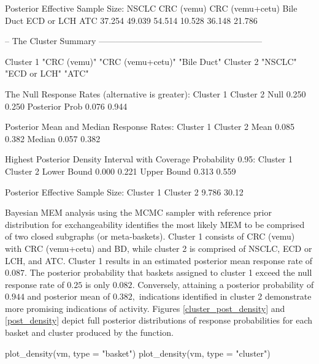 \begin{Schunk}
\begin{Soutput}
    Posterior Effective Sample Size:
      NSCLC CRC (vemu) CRC (vemu+cetu) Bile Duct ECD or LCH    ATC
     37.254     49.039          54.514    10.528     36.148 21.786
    
    -- The Cluster Summary ---------------------------------------------------------
    
    Cluster 1                                           
     "CRC (vemu)" "CRC (vemu+cetu)" "Bile Duct"
    Cluster 2                           
     "NSCLC" "ECD or LCH" "ATC"
    
    The Null Response Rates (alternative is greater):
                   Cluster 1 Cluster 2
    Null               0.250     0.250
    Posterior Prob     0.076     0.944
    
    Posterior Mean and Median Response Rates:
           Cluster 1 Cluster 2
    Mean       0.085     0.382
    Median     0.057     0.382
    
    Highest Posterior Density Interval with Coverage Probability 0.95:
                Cluster 1 Cluster 2
    Lower Bound     0.000     0.221
    Upper Bound     0.313     0.559
    
    Posterior Effective Sample Size:
     Cluster 1 Cluster 2
         9.786     30.12

\end{Soutput}
\end{Schunk}

Bayesian MEM analysis using the MCMC sampler with reference prior distribution for exchangeability identifies the most likely MEM to be comprised of two closed subgraphs (or meta-baskets). Cluster 1 consists of CRC (vemu) with CRC (vemu+cetu) and BD, while cluster 2 is comprised of NSCLC, ECD or LCH, and ATC. Cluster 1 results in an estimated posterior mean response rate of $0.087.$ The posterior probability that baskets assigned to cluster 1 exceed the null response rate of $0.25$ is only $0.082.$ Conversely, attaining a posterior probability of $0.944$ and posterior mean of $0.382,$ indications identified in cluster 2 demonstrate more promising indications of activity. Figures \ref{cluster_post_density} and \ref{post_density} depict full posterior distributions of response probabilities for each basket and cluster produced by the  function.  

\begin{Schunk}
\begin{Sinput}
	plot_density(vm, type = "basket")
	plot_density(vm, type = "cluster")
\end{Sinput}
\end{Schunk}

